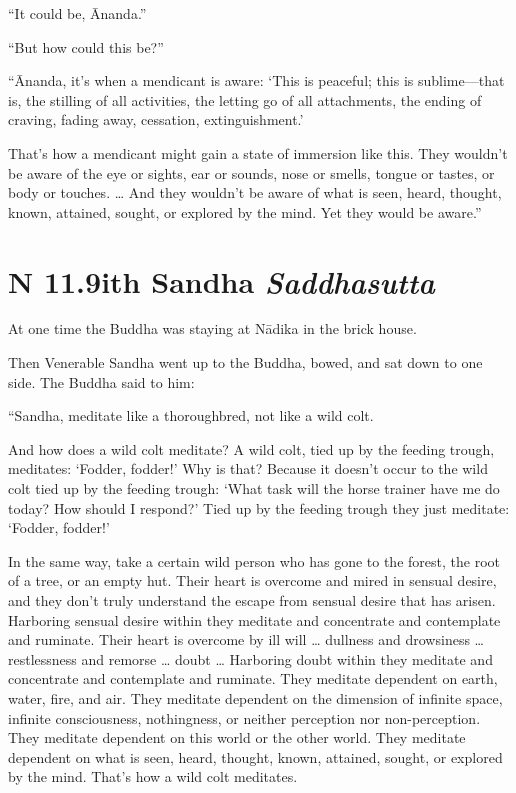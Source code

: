 \documentclass[12pt,openany]{book}%
\newcommand*{\suttatitleacronym}[1]{\smaller[2]{#1}\vspace*{.3em}}
\newcommand*{\suttatitletranslation}[1]{\linebreak{#1}}
\newcommand*{\suttatitleroot}[1]{\linebreak\smaller[2]\itshape{#1}}
\newcommand*{\tocacronym}[1]{\hspace*{-3.3em}{#1}\quad}
\newcommand*{\toctranslation}[1]{#1}
\newcommand*{\tocroot}[1]{(\textit{#1})}
\begin{document}
“It could be, Ānanda.” 

“But how could this be?” 

“Ānanda, it’s when a mendicant is aware: ‘This is peaceful; this is sublime—that is, the stilling of all activities, the letting go of all attachments, the ending of craving, fading away, cessation, extinguishment.’ 

That’s how a mendicant might gain a state of immersion like this. They wouldn’t be aware of the eye or sights, ear or sounds, nose or smells, tongue or tastes, or body or touches. … And they wouldn’t be aware of what is seen, heard, thought, known, attained, sought, or explored by the mind. Yet they would be aware.” 

%
\section*{{\suttatitleacronym AN 11.9}{\suttatitletranslation With Sandha }{\suttatitleroot Saddhasutta}}
\addcontentsline{toc}{section}{\tocacronym{AN 11.9} \toctranslation{With Sandha } \tocroot{Saddhasutta}}

At one time the Buddha was staying at \textsanskrit{Nādika} in the brick house. 

Then Venerable Sandha went up to the Buddha, bowed, and sat down to one side. The Buddha said to him: 

“Sandha, meditate like a thoroughbred, not like a wild colt. 

And how does a wild colt meditate? A wild colt, tied up by the feeding trough, meditates: ‘Fodder, fodder!’ Why is that? Because it doesn’t occur to the wild colt tied up by the feeding trough: ‘What task will the horse trainer have me do today? How should I respond?’ Tied up by the feeding trough they just meditate: ‘Fodder, fodder!’ 

In the same way, take a certain wild person who has gone to the forest, the root of a tree, or an empty hut. Their heart is overcome and mired in sensual desire, and they don’t truly understand the escape from sensual desire that has arisen. Harboring sensual desire within they meditate and concentrate and contemplate and ruminate. Their heart is overcome by ill will … dullness and drowsiness … restlessness and remorse … doubt … Harboring doubt within they meditate and concentrate and contemplate and ruminate. They meditate dependent on earth, water, fire, and air. They meditate dependent on the dimension of infinite space, infinite consciousness, nothingness, or neither perception nor non-perception. They meditate dependent on this world or the other world. They meditate dependent on what is seen, heard, thought, known, attained, sought, or explored by the mind. That’s how a wild colt meditates. 
\end{document}
